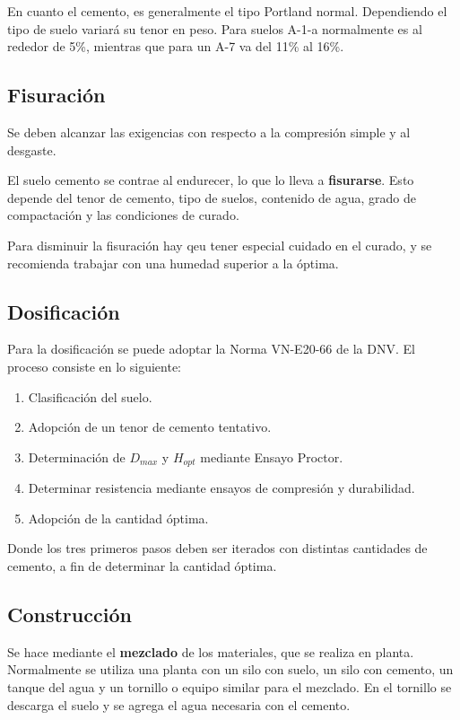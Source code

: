 \documentclass[../main.tex]{subfiles}
\begin{document}
En cuanto el cemento, es generalmente el tipo Portland normal. Dependiendo el 
tipo de suelo variará su tenor en peso. Para suelos A-1-a normalmente es al
rededor de 5\%, mientras que para un A-7 va del 11\% al 16\%.

\subsection{Fisuración}

Se deben alcanzar las exigencias con respecto a la compresión simple y al
desgaste.

El suelo cemento se contrae al endurecer, lo que lo lleva a \textbf{fisurarse}.
Esto depende del tenor de cemento, tipo de suelos, contenido de agua, grado de 
compactación y las condiciones de curado. 

Para disminuir la fisuración hay qeu tener especial cuidado en el curado, y se
recomienda trabajar con una humedad superior a la óptima.

\subsection{Dosificación}

Para la dosificación se puede adoptar la Norma VN-E20-66 de la DNV. El proceso
consiste en lo siguiente:

\begin{enumerate}
  \item Clasificación del suelo.
  \item Adopción de un tenor de cemento tentativo.
  \item Determinación de $D_{max}$ y $H_{opt}$ mediante Ensayo Proctor.
  \item Determinar resistencia mediante ensayos de compresión y durabilidad.
  \item Adopción de la cantidad óptima.
\end{enumerate}

Donde los tres primeros pasos deben ser iterados con distintas cantidades de 
cemento, a fin de determinar la cantidad óptima.

\subsection{Construcción}

Se hace mediante el \textbf{mezclado} de los materiales, que se realiza en 
planta. Normalmente se utiliza una planta con un silo con suelo, un silo con 
cemento, un tanque del agua y un tornillo o equipo similar para el mezclado. 
En el tornillo se descarga el suelo y se agrega el agua necesaria con el 
cemento.
\end{document}
